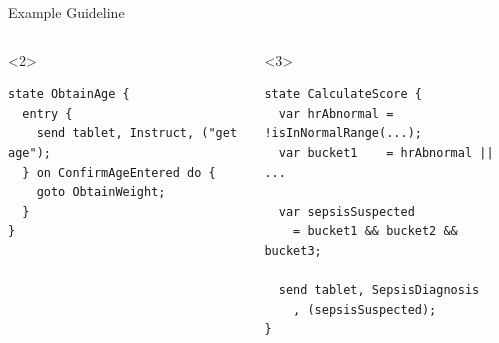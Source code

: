 \documentclass{beamer}
\begin{document}
\begin{frame}[fragile]{Example \MediK{} Guideline}
  \begin{columns}
      
    \begin{onlyenv}<2>
      \begin{lstlisting}[language=medik, style=mediksty, basicstyle=\ttfamily\tiny]
state ObtainAge {
  entry {
    send tablet, Instruct, ("get age");
  } on ConfirmAgeEntered do {
    goto ObtainWeight;
  }
}
    \end{lstlisting}
    \end{onlyenv}
    \begin{onlyenv}<3>
      \begin{lstlisting}[language=medik, style=mediksty, basicstyle=\ttfamily\tiny]
state CalculateScore {
  var hrAbnormal = !isInNormalRange(...);
  var bucket1    = hrAbnormal || ...

  var sepsisSuspected
    = bucket1 && bucket2 && bucket3;

  send tablet, SepsisDiagnosis
    , (sepsisSuspected);
}
      \end{lstlisting}
    \end{onlyenv}
  \end{columns}
\end{frame}
\end{document}
